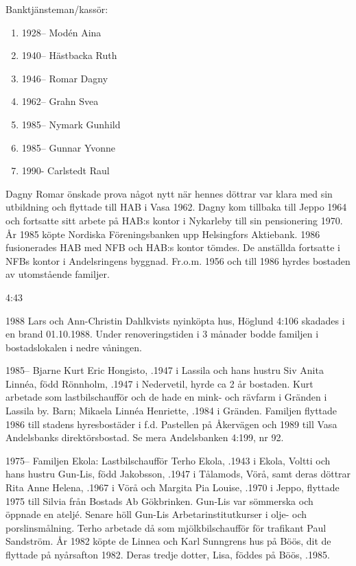Banktjänsteman/kassör:
\begin{enumerate}
  \item 1928-- Modén Aina
  \item 1940--	Hästbacka Ruth
  \item 1946--	Romar Dagny
  \item 1962-- Grahn Svea
  \item 1985-- Nymark Gunhild
  \item 1985--	Gunnar Yvonne
  \item 1990- 	  Carlstedt Raul
\end{enumerate}

Dagny Romar önskade prova något nytt när hennes döttrar var klara med sin utbildning och flyttade till HAB i Vasa 1962. Dagny kom tillbaka till Jeppo 1964 och fortsatte sitt arbete på HAB:s kontor i Nykarleby till sin pensionering 1970. År 1985 köpte Nordiska Föreningsbanken upp Helsingfors Aktiebank. 1986 fusionerades HAB med NFB och HAB:s kontor tömdes. De anställda fortsatte i NFBs kontor i Andelsringens byggnad. Fr.o.m. 1956 och till 1986 hyrdes bostaden av utomstående familjer.

 4:43

1988
Lars och Ann-Christin Dahlkvists nyinköpta hus, Höglund 4:106 skadades i en brand 01.10.1988. Under renoveringstiden i 3 månader bodde familjen i bostadslokalen i nedre våningen.


1985--
Bjarne Kurt Eric Hongisto, .1947 i Lassila och hans hustru Siv Anita Linnéa, född Rönnholm, .1947 i Nedervetil, hyrde ca 2 år bostaden. Kurt arbetade som lastbilschaufför och de hade en mink- och rävfarm i Gränden i Lassila by. Barn; Mikaela Linnéa Henriette, .1984 i Gränden. Familjen flyttade 1986 till stadens hyresbostäder i f.d. Pastellen på Åkervägen och 1989 till Vasa Andelsbanks direktörsbostad. Se mera Andelsbanken 4:199, nr	92.


1975--
Familjen Ekola:	Lastbilschaufför Terho Ekola, .1943 i Ekola, Voltti och hans hustru Gun-Lis, född Jakobsson, .1947 i Tålamods, Vörå, samt deras döttrar Rita Anne Helena, .1967 i Vörå och Margita Pia Louise, .1970 i Jeppo, flyttade 1975 till Silvia från Bostads Ab	Gökbrinken. Gun-Lis var sömmerska och öppnade en ateljé. Senare höll Gun-Lis Arbetarinstitutkurser i olje- och porslinsmålning. Terho arbetade då som mjölkbilschaufför för trafikant Paul Sandström. År 1982 	köpte de Linnea och Karl Sunngrens hus på Böös, dit de 	flyttade på nyårsafton 1982. Deras tredje dotter, Lisa, föddes på Böös, .1985.


